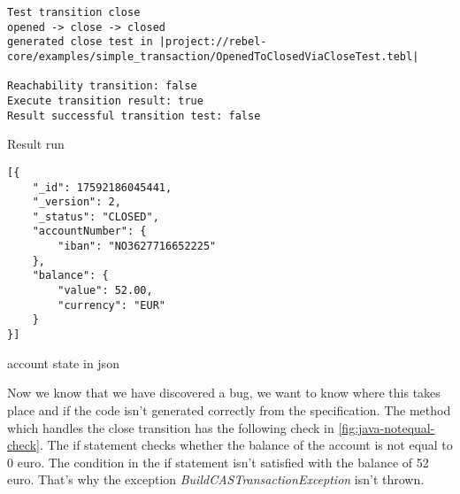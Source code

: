 

\begin{sourcecode}[h!]
\begin{lstlisting}[]
Test transition close
opened -> close -> closed
generated close test in |project://rebel-core/examples/simple_transaction/OpenedToClosedViaCloseTest.tebl|

Reachability transition: false
Execute transition result: true
Result successful transition test: false
\end{lstlisting}
\caption{Result run}
\label{fig:result-close-account}
\end{sourcecode}

\begin{sourcecode}[h!]
\begin{lstlisting}[]
[{
	"_id": 17592186045441,
	"_version": 2,
	"_status": "CLOSED",
	"accountNumber": {
		"iban": "NO3627716652225"
	},
	"balance": {
		"value": 52.00,
		"currency": "EUR"
	}
}]
\end{lstlisting}
\caption{account state in json}
\label{fig:closed-account-json}
\end{sourcecode}









Now we know that we have discovered a bug, we want to know where this takes place and if the code isn't generated correctly from the specification. The method which handles the close transition has the following check in \autoref{fig:java-notequal-check}. The if statement checks whether the balance of the account is not equal to 0 euro. The condition in the if statement isn't satisfied with the balance of 52 euro. That's why the exception \textit{BuildCASTransactionException} isn't thrown.

